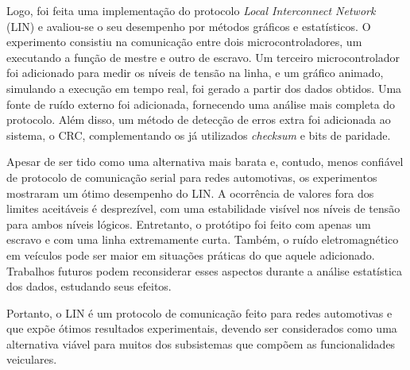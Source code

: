 

Logo, foi feita uma implementação do protocolo \textit{Local Interconnect Network} (LIN) e avaliou-se o seu desempenho por métodos gráficos e estatísticos. O experimento consistiu na comunicação entre dois microcontroladores, um executando a função de mestre e outro de escravo. Um terceiro microcontrolador foi adicionado para medir os níveis de tensão na linha, e um gráfico animado, simulando a execução em tempo real, foi gerado a partir dos dados obtidos. Uma fonte de ruído externo foi adicionada, fornecendo uma análise mais completa do protocolo. Além disso, um método de detecção de erros extra foi adicionada ao sistema, o CRC, complementando os já utilizados \textit{checksum} e bits de paridade.

Apesar de ser tido como uma alternativa mais barata e, contudo, menos confiável de protocolo de comunicação serial para redes automotivas, os experimentos mostraram um ótimo desempenho do LIN. A ocorrência de valores fora dos limites aceitáveis é desprezível, com uma estabilidade visível nos níveis de tensão para ambos níveis lógicos. Entretanto, o protótipo foi feito com apenas um escravo e com uma linha extremamente curta. Também, o ruído eletromagnético em veículos pode ser maior em situações práticas do que aquele adicionado. Trabalhos futuros podem reconsiderar esses aspectos durante a análise estatística dos dados, estudando seus efeitos.

Portanto, o LIN é um protocolo de comunicação feito para redes automotivas e que expõe ótimos resultados experimentais, devendo ser considerados como uma alternativa viável para muitos dos subsistemas que compõem as funcionalidades veiculares.

